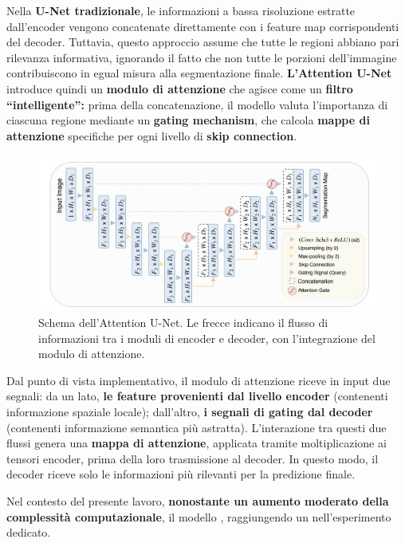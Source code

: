 Nella \textbf{U-Net tradizionale}, le informazioni a bassa risoluzione estratte dall’encoder vengono concatenate direttamente con i feature map corrispondenti del decoder. Tuttavia, questo approccio assume che tutte le regioni abbiano pari rilevanza informativa, ignorando il fatto che non tutte le porzioni dell’immagine contribuiscono in egual misura alla segmentazione finale. \textbf{L’Attention U-Net} introduce quindi un \textbf{modulo di attenzione} che agisce come un \textbf{filtro “intelligente”:} prima della concatenazione, il modello valuta l’importanza di ciascuna regione mediante un \textbf{gating mechanism}, che calcola \textbf{mappe di attenzione} specifiche per ogni livello di \textbf{skip connection}.

\begin{figure}[H] 
  	\centering 
 	\includegraphics[width=.8\textwidth]{images/2025-07-22-14-33-52.png} 
    \caption{Schema dell’Attention U-Net. Le frecce indicano il flusso di informazioni tra i moduli di encoder e decoder, con l’integrazione del modulo di attenzione.}
    \label{fig:attention_unet}
 \end{figure} 
Dal punto di vista implementativo, il modulo di attenzione riceve in input due segnali: da un lato, \textbf{le feature provenienti dal livello encoder} (contenenti informazione spaziale locale); dall’altro, \textbf{i segnali di gating dal decoder} (contenenti informazione semantica più astratta). L’interazione tra questi due flussi genera una \textbf{mappa di attenzione}, applicata tramite moltiplicazione ai tensori encoder, prima della loro trasmissione al decoder. In questo modo, il decoder riceve solo le informazioni più rilevanti per la predizione finale.

Nel contesto del presente lavoro, \textbf{nonostante un aumento moderato della complessità computazionale}, il modello , raggiungendo un  nell’esperimento dedicato.


